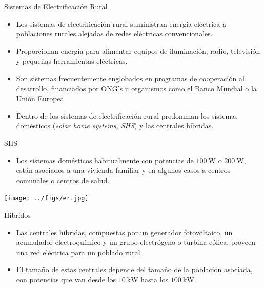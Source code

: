 \documentclass[xcolor={usenames,svgnames,dvipsnames}]{beamer}
\begin{document}
\begin{frame}[label={sec:orge5b4811}]{Sistemas de Electrificación Rural}
\begin{itemize}
\item Los sistemas de electrificación rural suministran energía eléctrica
a poblaciones rurales alejadas de redes eléctricas convencionales.

\item Proporcionan energía para alimentar equipos de iluminación, radio,
televisión y pequeñas herramientas eléctricas.

\item Son sistemas frecuentemente englobados en programas de cooperación
al desarrollo, financiados por ONG's u organismos como el Banco
Mundial o la Unión Europea.

\item Dentro de los sistemas de electrificación rural predominan los
sistemas domésticos (\emph{solar home systems, SHS}) y las centrales
híbridas.
\end{itemize}
\end{frame}

\begin{frame}[label={sec:org2bc0df8}]{SHS}
\begin{itemize}
\item Los sistemas domésticos habitualmente con potencias de
\(\SI{100}{\watt}\) o \(\SI{200}{\watt}\), están asociados a una
vivienda familiar y en algunos casos a centros comunales o centros
de salud.
\end{itemize}

\begin{center}
\texttt{[image: ../figs/er.jpg]}
\end{center}
\end{frame}


\begin{frame}[label={sec:org94596df}]{Híbridos}
\begin{itemize}
\item Las centrales híbridas, compuestas por un generador fotovoltaico, un
acumulador electroquímico y un grupo electrógeno o turbina eólica,
proveen una red eléctrica para un poblado rural.

\item El tamaño de estas centrales depende del tamaño de la población
asociada, con potencias que van desde los \(\SI{10}{\kilo\watt}\)
hasta los \(\SI{100}{\kilo\watt}\).
\end{itemize}
\end{frame}
\end{document}
